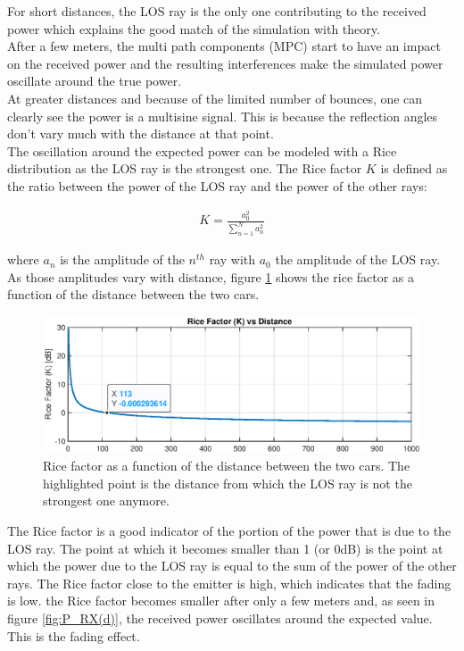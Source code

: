 \documentclass[10pt,a4paper]{ULBreport}
\begin{document}
For short distances, the LOS ray is the only one contributing to the received power which explains the good match of the simulation with theory. \\
After a few meters, the multi path components (MPC) start to have an impact on the received power and the resulting interferences make the simulated power oscillate around the true power. \\
At greater distances and because of the limited number of bounces, one can clearly see the power is a multisine signal. This is because the reflection angles don't vary much with the distance at that point.\\

The oscillation around the expected power can be modeled with a Rice distribution as the LOS ray is the strongest one. The Rice factor $K$ is defined as the ratio between the power of the LOS ray and the power of the other rays:

\begin{align*}
    K = \frac{a_0^2}{\sum_{n=1}^{N}a_n^2}
\end{align*}

where $a_n$ is the amplitude of the $n^{th}$ ray with $a_0$ the amplitude of the LOS ray. As those amplitudes vary with distance, figure \ref{fig:K(d)} shows the rice factor as a function of the distance between the two cars. 

\begin{figure}[H]
    \centering
    \includegraphics[width=1\textwidth]{3_4.eps}
    \caption{Rice factor as a function of the distance between the two cars. The highlighted point is the distance from which the LOS ray is not the strongest one anymore.}
    \label{fig:K(d)}
\end{figure}

The Rice factor is a good indicator of the portion of the power that is due to the LOS ray. The point at which it becomes smaller than 1 (or 0dB) is the point at which the power due to the LOS ray is equal to the sum of the power of the other rays. The Rice factor close to the emitter is high, which indicates that the fading is low. the Rice factor becomes smaller after only a few meters and, as seen in figure \ref{fig:P_RX(d)}, the received power oscillates around the expected value. This is the fading effect.\\
\end{document}
